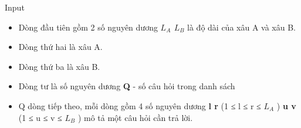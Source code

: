 Input
\begin{itemize}
	\item     Dòng đầu tiên gồm 2 số nguyên dương    \textbf{     $L_{A}$     $L_{B}$}    là độ dài của xâu A và xâu B.   
	\item     Dòng thứ hai là xâu A.   
	\item     Dòng thứ ba là xâu B.   
	\item     Dòng tư là số nguyên dương    \textbf{     Q    }    - số câu hỏi trong danh sách   
	\item     Q dòng tiếp theo, mỗi dòng gồm 4 số nguyên dương    \textbf{     l r    }    (1 ≤ l ≤ r ≤ $L_{A}$    )    \textbf{     u v    }    (1 ≤ u ≤ v ≤ $L_{B}$    ) mô tả một câu hỏi cần trả lời.   
\end{itemize}